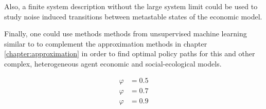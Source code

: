 Also, a finite system description without the large system limit could be used to study noise induced transitions between metastable states \citep{VandenBroeck1994, Klemm2003} of the economic model.


Finally, one could use methods methods from unsupervised machine learning similar to \cite{Strnad2019} to complement the approximation methods in chapter \ref{chapter:approximation} in order to find optimal policy paths for this and other complex, heterogeneous agent economic and social-ecological models.

\begin{align}
  \varphi &= 0.5 \\
  \varphi &= 0.7 \\
  \varphi &= 0.9 \\
\end{align}

